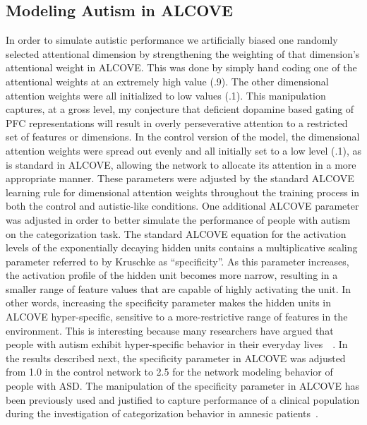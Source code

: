 \documentclass[man]{apa}
\begin{document}
\subsection{Modeling Autism in ALCOVE}
In order to simulate autistic performance we artificially biased one randomly selected attentional dimension by strengthening the weighting of that dimension's attentional weight in ALCOVE.  This was done by simply hand coding one of the attentional weights at an extremely high value (.9).  The other dimensional attention weights were all initialized to low values (.1).  This manipulation captures, at a gross level, my conjecture that deficient dopamine based gating of PFC representations will result in overly perseverative attention to a restricted set of features or dimensions.  In the control version of the model, the dimensional attention weights were spread out evenly and all initially set to a low level (.1), as is standard in ALCOVE, allowing the network to allocate its attention in a more appropriate manner.  These parameters were adjusted by the standard ALCOVE learning rule for dimensional attention weights throughout the training process in both the control and autistic-like conditions.  One additional ALCOVE parameter was adjusted in order to better simulate the performance of people with autism on the categorization task.  The standard ALCOVE equation for the activation levels of the exponentially decaying hidden units contains a multiplicative scaling parameter referred to  by Kruschke as ``specificity''.  As this parameter increases, the activation profile of the hidden unit becomes more narrow, resulting in a smaller range of feature values that are capable of highly activating the unit.  In other words, increasing the specificity parameter makes the hidden units in ALCOVE hyper-specific, sensitive to a more-restrictive range of features in the environment.  This is interesting because many researchers have argued that people with autism exhibit hyper-specific behavior in their everyday lives~~\cite{McClellandJL:2000:Autism,HappeF:1999:WCC}.  In the results described next, the specificity parameter in ALCOVE was adjusted from 1.0 in the control network to 2.5 for the network modeling behavior of people with ASD.  The manipulation of the specificity parameter in ALCOVE has been previously used and justified to capture performance of a clinical population during the investigation of categorization behavior in amnesic patients~\cite{NosofskyRM:1998:LCOVEAmnesia}. 

\end{document}
